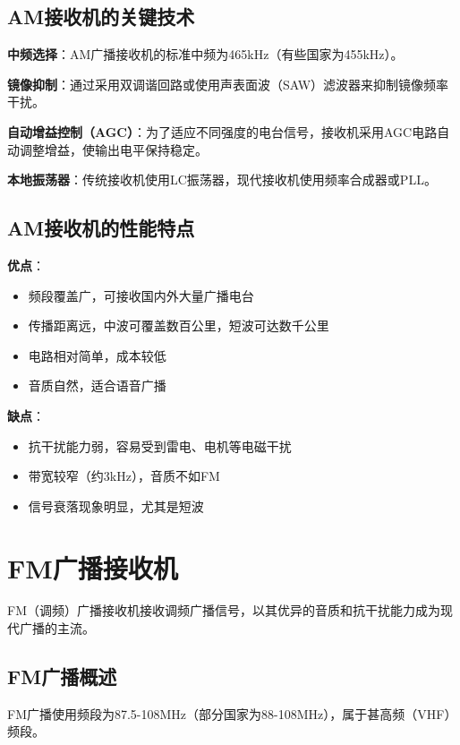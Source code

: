 \subsection{AM接收机的关键技术}
\label{sec:am_receiver_tech}

\textbf{中频选择}：AM广播接收机的标准中频为465kHz（有些国家为455kHz）。

\textbf{镜像抑制}：通过采用双调谐回路或使用声表面波（SAW）滤波器来抑制镜像频率干扰。

\textbf{自动增益控制（AGC）}：为了适应不同强度的电台信号，接收机采用AGC电路自动调整增益，使输出电平保持稳定。

\textbf{本地振荡器}：传统接收机使用LC振荡器，现代接收机使用频率合成器或PLL。

\subsection{AM接收机的性能特点}
\label{sec:am_receiver_performance}

\textbf{优点}：
\begin{itemize}
    \item 频段覆盖广，可接收国内外大量广播电台
    \item 传播距离远，中波可覆盖数百公里，短波可达数千公里
    \item 电路相对简单，成本较低
    \item 音质自然，适合语音广播
\end{itemize}

\textbf{缺点}：
\begin{itemize}
    \item 抗干扰能力弱，容易受到雷电、电机等电磁干扰
    \item 带宽较窄（约3kHz），音质不如FM
    \item 信号衰落现象明显，尤其是短波
\end{itemize}

\section{FM广播接收机}
\label{sec:fm_broadcast_receiver}

FM（调频）广播接收机接收调频广播信号，以其优异的音质和抗干扰能力成为现代广播的主流。

\subsection{FM广播概述}
\label{sec:fm_broadcast_intro}

FM广播使用频段为87.5-108MHz（部分国家为88-108MHz），属于甚高频（VHF）频段。

